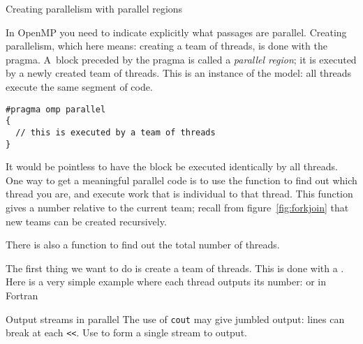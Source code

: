 

 {Creating parallelism with parallel regions}

In OpenMP you need to indicate explicitly what passages are
parallel. Creating parallelism, which here means: creating a team of threads,
is done with the  pragma.
A~block preceded by the  pragma
is called a \emph{parallel region}; it
is executed by a newly created team of threads. 
This is an instance of the  model: all threads execute the same
segment of code.
\begin{lstlisting}
#pragma omp parallel
{
  // this is executed by a team of threads
}
\end{lstlisting}

It would be pointless to have the block be executed identically by
all threads.
One way to get a meaningful parallel code is to use the function
 to find out which thread you are,
and execute work that is individual to that thread.
This function gives a number relative to the current team;
recall from figure~\ref{fig:forkjoin} that new teams can be created recursively.

There is also a function
 to find out the total number of threads.

The first thing we want to do is create a team of threads. This
is done with a .
Here is a very simple example where each thread
outputs its number:
or in Fortran

\begin{cppnote}{Output streams in parallel}
  \label{sl:par-stringstream}
  The use of \lstinline{cout} may give jumbled output:\slidebreak
  lines can break at each \verb+<<+.\slidebreak
  Use  to form a single stream to output.
  
\end{cppnote}

